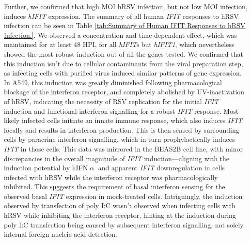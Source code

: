 Further, we confirmed that high MOI hRSV infection, but not low MOI infection, induces \textit{hIFIT} expression. The summary of all human \textit{IFIT} responses to hRSV infection can be seen in Table \ref{tab:Summary of Human IFIT Responses to hRSV Infection.}. We observed a concentration and time-dependent effect, which was maintained for at least 48 HPI, for all \textit{hIFITs} but \textit{hIFIT1}, which nevertheless showed the most robust induction out of all the genes tested. We confirmed that this induction isn't due to cellular contaminants from the viral preparation step, as infecting cells with purified virus induced similar patterns of gene expression. In A549, this induction was greatly diminished following pharmacological blockage of the interferon receptor, and completely abolished by UV-inactivation of hRSV, indicating the necessity of RSV replication for the initial \textit{IFIT} induction and functional interferon signalling for a robust \textit{IFIT} response. Most likely infected cells initiate an innate immune response, which also induces \textit{IFIT} locally and results in interferon production. This is then sensed by surrounding cells by paracrine interferon signalling, which in turn prophylactically induces \textit{IFIT} in those cells. This data was mirrored in the BEAS2B cell line, with minor discrepancies in the overall magnitude of \textit{IFIT} induction—aligning with the induction potential by hIFN$\upalpha$ and apparent \textit{IFIT} downregulation in cells infected with hRSV while the interferon receptor was pharmacologically inhibited. This sµggests the requirement of basal interferon sensing for the observed basal \textit{IFIT} expression in mock-treated cells. Intriguingly, the induction observed by transfection of poly I:C wasn't observed when infecting cells with hRSV while inhibiting the interferon receptor, hinting at the induction during poly I:C transfection being caused by subsequent interferon signalling, not solely internal foreign nucleic acid detection.

